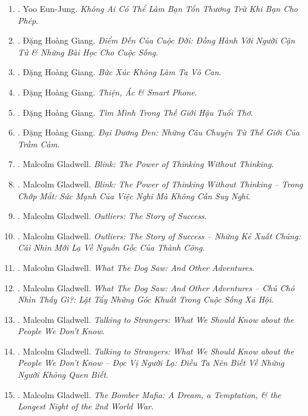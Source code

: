 \documentclass{article}
\begin{document}
\begin{enumerate}
	\item \cite{Eun-Jung2023}. Yoo Eun-Jung. {\it Không Ai Có Thể Làm Bạn Tổn Thương Trừ Khi Bạn Cho Phép}.\hfill{\sf[done]} 
	\item \cite{Giang2022a}. Đặng Hoàng Giang. {\it Điểm Đến Của Cuộc Đời: Đồng Hành Với Người Cận Tử \& Những Bài Học Cho Cuộc Sống}.\\\mbox{}\hfill{\sf[done]}
	\item \cite{Giang2022b}. Đặng Hoàng Giang. {\it Bức Xúc Không Làm Ta Vô Can}.\hfill{\sf[done]}
	\item \cite{Giang2022c}. Đặng Hoàng Giang. {\it Thiện, Ác \& Smart Phone}.\hfill{\sf[done]}
	\item \cite{Giang2022d}. Đặng Hoàng Giang. {\it Tìm Mình Trong Thế Giới Hậu Tuổi Thơ}.\hfill{\sf[done]}
	\item \cite{Giang2023}. Đặng Hoàng Giang. {\it Đại Dương Đen: Những Câu Chuyện Từ Thế Giới Của Trầm Cảm}.\hfill{\sf[done]}
	\item \cite{Gladwell2007}. Malcolm Gladwell. {\it Blink: The Power of Thinking Without Thinking}.\hfill{\sf[reading]}
	\item \cite{Gladwell_blink}. Malcolm Gladwell. {\it Blink: The Power of Thinking Without Thinking -- Trong Chớp Mắt: Sức Mạnh Của Việc Nghĩ Mà Không Cần Suy Nghĩ}.\hfill{\sf[done]}
	\item \cite{Gladwell2008}. Malcolm Gladwell. {\it Outliers: The Story of Success}.\hfill{\sf[reading]}
	\item \cite{Gladwell_outlier}. Malcolm Gladwell. {\it Outliers: The Story of Success -- Những Kẻ Xuất Chúng: Cái Nhìn Mới Lạ Về Nguồn Gốc Của Thành Công}.\hfill{\sf[done]}
	\item \cite{Gladwell2009}. Malcolm Gladwell. {\it What The Dog Saw: And Other Adventures}.\hfill{\sf[reading]}
	\item \cite{Gladwell_dog}. Malcolm Gladwell. {\it What The Dog Saw: And Other Adventures -- Chú Chó Nhìn Thấy Gì?: Lật Tẩy Những Góc Khuất Trong Cuộc Sống Xã Hội}.\hfill{\sf[done]}
	\item \cite{Gladwell2019}. Malcolm Gladwell. {\it Talking to Strangers: What We Should Know about the People We Don't Know}.\hfill{\sf[reading]}
	\item \cite{Gladwell_stranger}. Malcolm Gladwell. {\it Talking to Strangers: What We Should Know about the People We Don't Know -- Đọc Vị Người Lạ: Điều Ta Nên Biết Về Những Người Không Quen Biết}.\hfill{\sf[done]}
	\item \cite{Gladwell2021}. Malcolm Gladwell. {\it The Bomber Mafia: A Dream, a Temptation, \& the Longest Night of the 2nd World War}.\hfill{\sf[reading]}

\end{enumerate}
\end{document}
